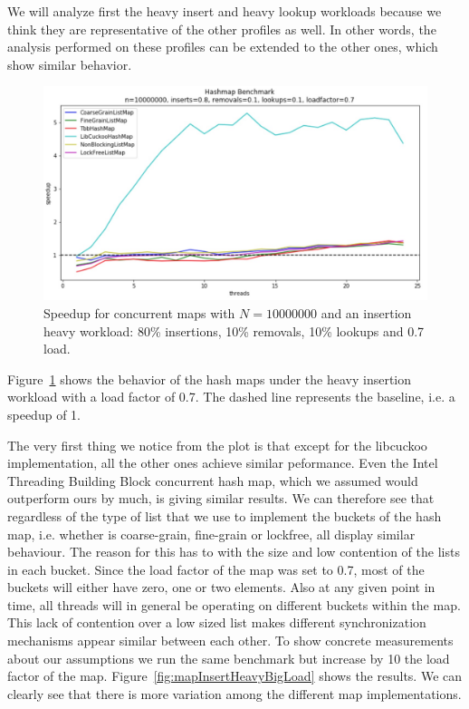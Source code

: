 \documentclass[11pt]{article}
\begin{document}
We will analyze first the heavy insert and heavy lookup workloads because we 
think they are representative of the other profiles as well. In other words, 
the analysis performed on these profiles can be extended to the
other ones, which show similar behavior.

\begin{figure}[!htb]
\centering
\includegraphics[width=1.0\linewidth]{figs/patricio/latedays/inserts_heavy.jpg}
\caption{
Speedup for concurrent maps with $N=10000000$ and an insertion heavy workload:
80\% insertions, 10\% removals, 10\% lookups and 0.7 load.}
\label{fig:mapInsertHeavy}
\end{figure}

Figure~\ref{fig:mapInsertHeavy} shows the behavior of the hash maps under the
heavy insertion workload with a load factor of 0.7. The dashed line represents
the baseline, i.e. a speedup of 1.

The very first thing we notice from the plot is that except for the libcuckoo
implementation, all the other ones achieve similar peformance. Even the Intel 
Threading Building Block concurrent hash map, which we assumed would
outperform ours by much, is giving similar results. We can therefore see that regardless of the
type of list that we use to implement the buckets of the hash map, i.e. whether 
is coarse-grain, fine-grain or lockfree, all display similar behaviour.
The reason for this has to with the size and low contention of the lists in each bucket. 
Since the load factor of the map was set to 0.7, most of the buckets 
will either have zero, one or two elements. Also at any given point in time, all threads 
will in general be operating on different buckets within the map. This lack
of contention over a low sized list makes different synchronization mechanisms
appear similar between each other. To show concrete measurements about our assumptions
we run the same benchmark but increase by 10 the load factor of the map. 
Figure~\ref{fig:mapInsertHeavyBigLoad} shows the results. We can clearly see that there
is more variation among the different map implementations.
\end{document}
